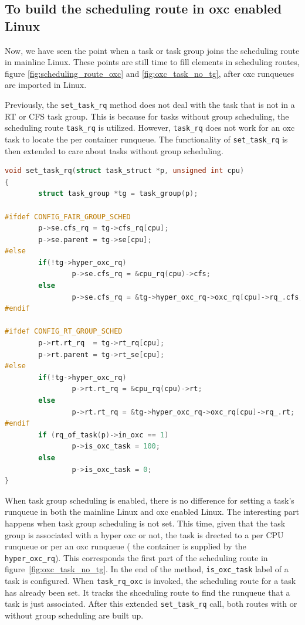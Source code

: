 \subsection{To build the scheduling route in oxc enabled Linux}

Now, we have seen the point when a task or task group joins the scheduling 
route in mainline Linux. These points are still time to fill elements in 
scheduling routes, figure \ref{fig:scheduling_route_oxc} and 
\ref{fig:oxc_task_no_tg}, after oxc runqueues are imported in Linux.

Previously, the \texttt{set\_task\_rq} method does not deal with the task 
that is not in a RT or CFS task group. This is because for tasks without 
group scheduling, the scheduling route \texttt{task\_rq} is utilized.
However, \texttt{task\_rq} does not work for an oxc task to locate the
per container runqueue. The functionality of \texttt{set\_task\_rq} is
then extended to care about tasks without group scheduling. 

\begin{lstlisting}[language=C, 
        caption={The extended \texttt{set\_task\_rq}}]
void set_task_rq(struct task_struct *p, unsigned int cpu)
{
        struct task_group *tg = task_group(p);

#ifdef CONFIG_FAIR_GROUP_SCHED
        p->se.cfs_rq = tg->cfs_rq[cpu];
        p->se.parent = tg->se[cpu];
#else
        if(!tg->hyper_oxc_rq)
                p->se.cfs_rq = &cpu_rq(cpu)->cfs;
        else
                p->se.cfs_rq = &tg->hyper_oxc_rq->oxc_rq[cpu]->rq_.cfs;
#endif

#ifdef CONFIG_RT_GROUP_SCHED
        p->rt.rt_rq  = tg->rt_rq[cpu];
        p->rt.parent = tg->rt_se[cpu];
#else
        if(!tg->hyper_oxc_rq)
                p->rt.rt_rq = &cpu_rq(cpu)->rt;
        else
                p->rt.rt_rq = &tg->hyper_oxc_rq->oxc_rq[cpu]->rq_.rt;
#endif
        if (rq_of_task(p)->in_oxc == 1)
                p->is_oxc_task = 100;
        else
                p->is_oxc_task = 0;
}
\end{lstlisting}
                                                  
When task group scheduling is enabled, there is no difference for setting a 
task's runqueue in both
the mainline Linux and oxc enabled Linux. The interesting part happens when 
task group scheduling is not set. This time, given that the task group is 
associated with a hyper oxc or not, the task is drected to a per CPU runqueue
or per an oxc runqueue ( the container is supplied by the 
\texttt{hyper\_oxc\_rq}). This corresponds the first part of the scheduling 
route in figure~\ref{fig:oxc_task_no_tg}. In the end of the method, 
\texttt{is\_oxc\_task} label of a task is configured. When 
\texttt{task\_rq\_oxc} is invoked, the scheduling route for a task has already 
been set. It tracks the shceduling route to find the runqueue that a task is 
just associated. After this extended \texttt{set\_task\_rq} call, both routes 
with or without group scheduling are built up.

